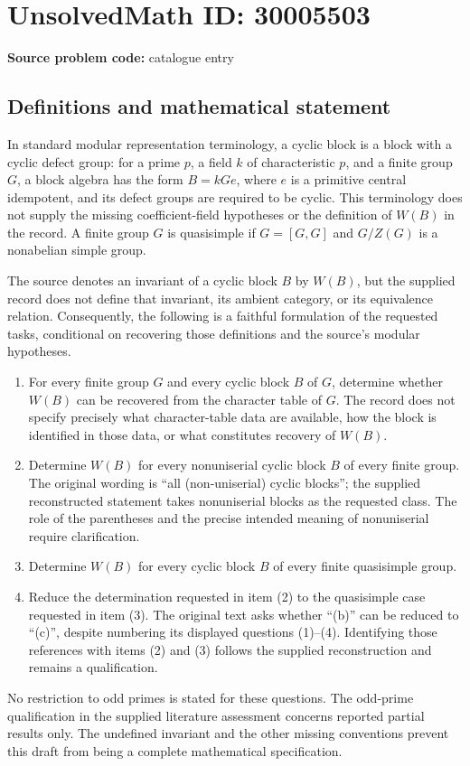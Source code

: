 \documentclass[11pt]{article}
\begin{document}
\section*{UnsolvedMath ID: 30005503}
\textbf{Source problem code:} catalogue entry
\subsection{Definitions and mathematical statement}
In standard modular representation terminology, a cyclic block is a block with a cyclic defect group: for a prime \(p\), a field \(k\) of characteristic \(p\), and a finite group \(G\), a block algebra has the form \(B=kGe\), where \(e\) is a primitive central idempotent, and its defect groups are required to be cyclic. This terminology does not supply the missing coefficient-field hypotheses or the definition of \(W(B)\) in the record. A finite group \(G\) is quasisimple if \(G=[G,G]\) and \(G/Z(G)\) is a nonabelian simple group.

The source denotes an invariant of a cyclic block \(B\) by \(W(B)\), but the supplied record does not define that invariant, its ambient category, or its equivalence relation. Consequently, the following is a faithful formulation of the requested tasks, conditional on recovering those definitions and the source's modular hypotheses.
\begin{enumerate}
\item For every finite group \(G\) and every cyclic block \(B\) of \(G\), determine whether \(W(B)\) can be recovered from the character table of \(G\). The record does not specify precisely what character-table data are available, how the block is identified in those data, or what constitutes recovery of \(W(B)\).
\item Determine \(W(B)\) for every nonuniserial cyclic block \(B\) of every finite group. The original wording is ``all (non-uniserial) cyclic blocks''; the supplied reconstructed statement takes nonuniserial blocks as the requested class. The role of the parentheses and the precise intended meaning of nonuniserial require clarification.
\item Determine \(W(B)\) for every cyclic block \(B\) of every finite quasisimple group.
\item Reduce the determination requested in item (2) to the quasisimple case requested in item (3). The original text asks whether ``(b)'' can be reduced to ``(c)'', despite numbering its displayed questions (1)--(4). Identifying those references with items (2) and (3) follows the supplied reconstruction and remains a qualification.
\end{enumerate}
No restriction to odd primes is stated for these questions. The odd-prime qualification in the supplied literature assessment concerns reported partial results only. The undefined invariant and the other missing conventions prevent this draft from being a complete mathematical specification.
\end{document}
